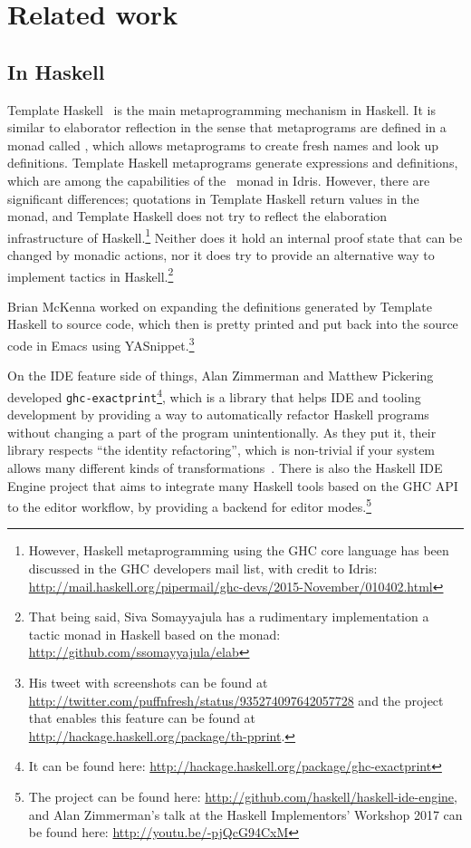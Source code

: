 \chapter{Related work} \label{chap:relatedwork}

\section{In Haskell}

Template Haskell~\cite{th} is the main metaprogramming mechanism in Haskell.
It is similar to elaborator reflection in the sense that metaprograms are
defined in a monad called , which allows metaprograms to create fresh
names and look up definitions.
Template Haskell metaprograms generate expressions and definitions, which are
among the capabilities of the \Elab\ monad in Idris.
However, there are significant differences;
quotations in Template Haskell return values in the  monad, and Template
Haskell does not try to reflect the elaboration infrastructure of
Haskell.\footnote{However, Haskell metaprogramming using the GHC core language
has been discussed in the GHC developers mail list, with credit to Idris:
\url{http://mail.haskell.org/pipermail/ghc-devs/2015-November/010402.html}}
Neither does it hold an internal proof state that can be changed by monadic
actions, nor it does try to provide an alternative way to implement tactics in
Haskell.\footnote{That being said, Siva Somayyajula has a rudimentary
implementation a tactic monad in Haskell based on the  monad:
\url{http://github.com/ssomayyajula/elab}}

Brian McKenna worked on expanding the definitions generated by Template Haskell
to source code, which then is pretty printed and put back into the source code
in Emacs using YASnippet.\footnote{His tweet with screenshots can be found at
\url{http://twitter.com/puffnfresh/status/935274097642057728} and the project
that enables this feature can be found at
\url{http://hackage.haskell.org/package/th-pprint}.}

On the IDE feature side of things, Alan Zimmerman and Matthew Pickering
developed \texttt{ghc-exactprint}\footnote{It can be found here:
\url{http://hackage.haskell.org/package/ghc-exactprint}}, which is a library
that helps IDE and tooling development by providing a way to automatically
refactor Haskell programs without changing a part of the program
unintentionally. As they put it, their library respects ``the identity
refactoring'', which is non-trivial if your system allows many different kinds
of transformations~\cite{ghc-exactprint-blog}.
There is also the Haskell IDE Engine project that aims to integrate many Haskell
tools based on the GHC API to the editor workflow, by providing a backend for
editor modes.\footnote{The project can be found here:
\url{http://github.com/haskell/haskell-ide-engine}, and Alan Zimmerman's talk
at the Haskell Implementors' Workshop 2017 can be found here:
\url{http://youtu.be/-pjQcG94CxM}}

